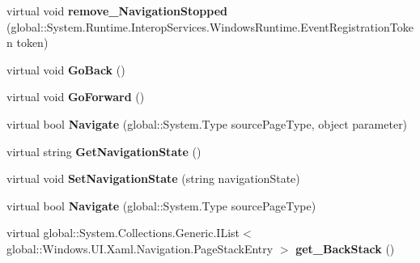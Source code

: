 \begin{DoxyCompactItemize}
\item 
\mbox{\label{class_windows_1_1_u_i_1_1_xaml_1_1_controls_1_1_frame_a18e9954aafd2a9225401b40871f4f115}} 
virtual void {\bfseries remove\+\_\+\+Navigation\+Stopped} (global\+::\+System.\+Runtime.\+Interop\+Services.\+Windows\+Runtime.\+Event\+Registration\+Token token)
\item 
\mbox{\label{class_windows_1_1_u_i_1_1_xaml_1_1_controls_1_1_frame_aa208a306e405ff8aad9dc0a19d722b18}} 
virtual void {\bfseries Go\+Back} ()
\item 
\mbox{\label{class_windows_1_1_u_i_1_1_xaml_1_1_controls_1_1_frame_a77897d1c6e165763d79d0444353627b6}} 
virtual void {\bfseries Go\+Forward} ()
\item 
\mbox{\label{class_windows_1_1_u_i_1_1_xaml_1_1_controls_1_1_frame_aa88f5dbc5d0be1aa7a6d29db649b5d3b}} 
virtual bool {\bfseries Navigate} (global\+::\+System.\+Type source\+Page\+Type, object parameter)
\item 
\mbox{\label{class_windows_1_1_u_i_1_1_xaml_1_1_controls_1_1_frame_a61a9544723df665a3302a9c9787d26e5}} 
virtual string {\bfseries Get\+Navigation\+State} ()
\item 
\mbox{\label{class_windows_1_1_u_i_1_1_xaml_1_1_controls_1_1_frame_ad11b0d06a73306aa6bdb716ba217bf42}} 
virtual void {\bfseries Set\+Navigation\+State} (string navigation\+State)
\item 
\mbox{\label{class_windows_1_1_u_i_1_1_xaml_1_1_controls_1_1_frame_a1ba0f46855026734880083781db1286b}} 
virtual bool {\bfseries Navigate} (global\+::\+System.\+Type source\+Page\+Type)
\item 
\mbox{\label{class_windows_1_1_u_i_1_1_xaml_1_1_controls_1_1_frame_a80ca191b072efed7111ea58c25416f2e}} 
virtual global\+::\+System.\+Collections.\+Generic.\+I\+List$<$ global\+::\+Windows.\+U\+I.\+Xaml.\+Navigation.\+Page\+Stack\+Entry $>$ {\bfseries get\+\_\+\+Back\+Stack} ()

\end{DoxyCompactItemize}
